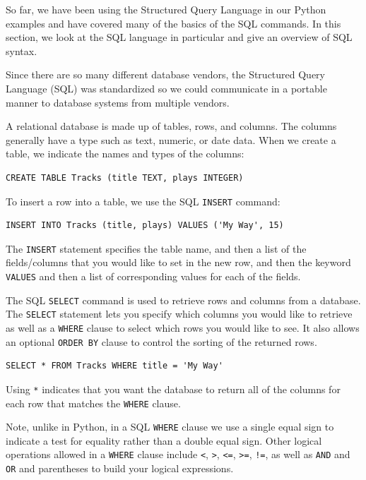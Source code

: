 \documentclass[11pt]{book}
\begin{document}
So far, we have been using the Structured Query Language in our Python
examples and have covered many of the basics of the SQL commands.
In this section, we look at the SQL language in particular
and give an overview of SQL syntax.

Since there are so many different database vendors, the Structured Query
Language (SQL) was standardized so we could communicate in a portable
manner to database systems from multiple vendors.

A relational database is made up of tables, rows, and columns.  The columns
generally have a type such as text, numeric, or date data.  When we create
a table, we indicate the names and types of the columns:

\beforeverb
\begin{verbatim}
CREATE TABLE Tracks (title TEXT, plays INTEGER)
\end{verbatim}
\afterverb
%
To insert a row into a table, we use the SQL {\tt INSERT} command:

\beforeverb
\begin{verbatim}
INSERT INTO Tracks (title, plays) VALUES ('My Way', 15)
\end{verbatim}
\afterverb
%
The {\tt INSERT} statement specifies the table name, and then a list of
the fields/columns that you would like to set in the new row, and then 
the keyword {\tt VALUES} and then a list of corresponding values 
for each of the fields.

The SQL {\tt SELECT} command is used to retrieve rows and columns from a database.
The {\tt SELECT} statement lets you specify which columns you would
like to retrieve as well as a {\tt WHERE} clause to select which 
rows you would like to see.  It also allows an optional 
{\tt ORDER BY} clause to control the sorting of the returned rows.

\beforeverb
\begin{verbatim}
SELECT * FROM Tracks WHERE title = 'My Way'
\end{verbatim}
\afterverb
%
Using \verb"*" indicates that you want the database to return all of 
the columns for each row that matches the {\tt WHERE} clause.  

Note, unlike in Python, in a SQL {\tt WHERE} clause 
we use a single equal sign 
to indicate a test for equality rather than a double equal sign.
Other logical operations allowed in a {\tt WHERE} clause include 
\verb"<",
\verb">",
\verb"<=",
\verb">=",
\verb"!=",
as well as {\tt AND} and {\tt OR} and parentheses
to build your logical expressions.
\end{document}
